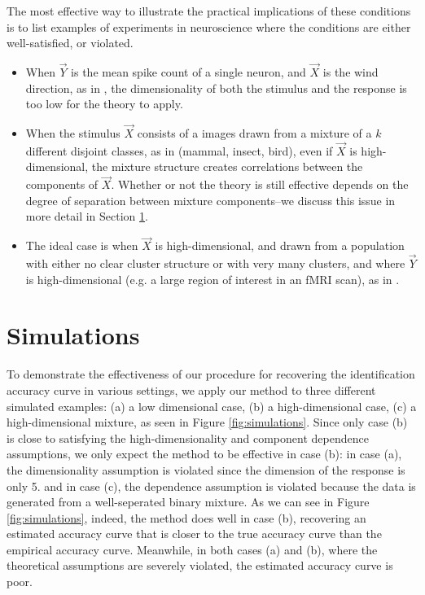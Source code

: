 \documentclass[12pt]{article}
\begin{document}
The most effective way to illustrate the practical implications of these conditions is to list examples of experiments in neuroscience where the conditions are either well-satisfied, or violated.
\begin{itemize}
\item When $\vec{Y}$ is the mean spike count of a single neuron, and $\vec{X}$ is the wind direction, as in \cite{Theunissen1991}, the dimensionality of both the stimulus and the response is too low for the theory to apply.
\item When the stimulus $\vec{X}$ consists of a images drawn from a mixture of a $k$ different disjoint classes, as in \cite{Connolly2012} (mammal, insect, bird), even if $\vec{X}$ is high-dimensional, the mixture structure creates correlations between the components of $\vec{X}$.  Whether or not the theory is still effective depends on the degree of separation between mixture components--we discuss this issue in more detail in Section \ref{sec:simulations}.
\item The ideal case is when $\vec{X}$ is high-dimensional, and drawn from a population with either no clear cluster structure or with very many clusters, and where $\vec{Y}$ is high-dimensional (e.g. a large region of interest in an fMRI scan), as in \cite{Kay2008a}\cite{Mitchell2008}.
\end{itemize}

\section{Simulations}\label{sec:simulations}

To demonstrate the effectiveness of our procedure for recovering the identification accuracy curve in various settings,
we apply our method to three different simulated examples: (a) a low dimensional case, (b) a high-dimensional case, (c) a high-dimensional mixture, as seen in Figure \ref{fig:simulations}.  Since only case (b) is close to satisfying the high-dimensionality and component dependence assumptions, we only expect the method to be effective in case (b): in case (a), the dimensionality assumption is violated since the dimension of the response is only 5. and in case (c), the dependence assumption is violated because the data is generated from a well-seperated binary mixture.  As we can see in Figure \ref{fig:simulations}, indeed, the method does well in case (b), recovering an estimated accuracy curve that is closer to the true accuracy curve than the empirical accuracy curve.  Meanwhile, in both cases (a) and (b), where the theoretical assumptions are severely violated, the estimated accuracy curve is poor.
\end{document}
